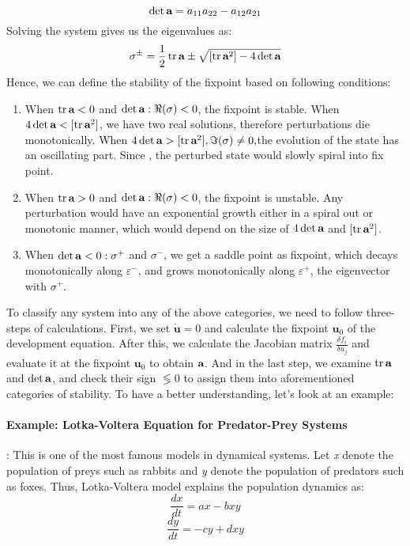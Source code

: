 \begin{equation}
\det\normalfont\textbf{a} = a_{11} a_{22}-a_{12} a_{21}
\end{equation}
Solving the system gives us the eigenvalues as:
\begin{equation}
\sigma^{\pm}=\frac{1}{2}\operatorname{tr} \normalfont\textbf{a} \pm \sqrt{[\operatorname{tr} \normalfont\textbf{a}^{2}] - 4\det\normalfont\textbf{a}}
\end{equation}
Hence, we can define the stability of the fixpoint based on following conditions:
\begin{enumerate}
\item When $ \operatorname{tr} \normalfont\textbf{a}<0 $ and $ \det \normalfont\textbf{a} : \Re(\sigma) < 0 $, the fixpoint is stable. When $ 4\det \normalfont\textbf{a} < [\operatorname{tr} \normalfont\textbf{a}^{2}] $, we have two real solutions, therefore perturbations die monotonically. When $ 4\det \normalfont\textbf{a} > [\operatorname{tr} \normalfont\textbf{a}^{2}],\Im(\sigma)\neq0, $the evolution of the state has an oscillating part. Since , the perturbed state would slowly spiral into fix point.
\item When $ \operatorname{tr} \normalfont\textbf{a}>0 $ and $ \det \normalfont\textbf{a} : \Re(\sigma) < 0 $, the fixpoint is unstable. Any perturbation would have an exponential growth either in a spiral out or monotonic manner, which would depend on the size of $ 4\det\normalfont\textbf{a} $ and $ [\operatorname{tr} \normalfont\textbf{a}^{2}] $.
\item When $ \det \normalfont\textbf{a}<0: \sigma^{+}$ and $ \sigma^{-} $, we get a saddle point as fixpoint, which decays monotonically along $\varepsilon^{-}$, and grows monotonically along $\varepsilon^{+}$, the eigenvector with $\sigma^{+}$.
\end{enumerate}

To classify any system into any of the above categories, we need to follow three-steps of calculations. First, we set $ \dot{\textbf{u}} = 0 $ and calculate the fixpoint $ \textbf{u}_{0} $ of the development equation. After this, we calculate the Jacobian matrix $ \frac{\delta f_{i}}{\delta u_{j}} $ and evaluate it at the fixpoint $ \textbf{u}_{0} $ to obtain $ \normalfont\textbf{a} $. And in the last step, we examine $ \operatorname{tr} \normalfont\textbf{a}$ and $ \det\normalfont\textbf{a}$, and check their sign $ \lessgtr 0 $ to assign them into aforementioned categories of stability. To have a better understanding, let’s look at an example:

\paragraph{Example: Lotka-Voltera Equation for Predator-Prey Systems}: This is one of the most famous models in dynamical systems. Let \textit{x} denote the population of preys such as rabbits and \textit{y} denote the population of predators such as foxes. Thus, Lotka-Voltera model explains the population dynamics as:
\begin{equation}
\frac{dx}{dt}=ax-bxy
\end{equation}
\begin{equation}
\frac{dy}{dt}=-cy+dxy
\end{equation}

